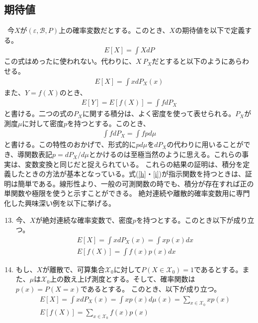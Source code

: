 \documentclass[a4j,12pt]{jarticle}
\begin{document}
\subsection{期待値}
\ 今$X$が$(\varepsilon,\mathcal{B},P)$上の確率変数だとする。このとき、$X$の期待値を以下で定義する。
\begin{align}
\label{j}
E[X] = \int X dP
\end{align}
この式はめったに使われない。代わりに、$X ~ P_{X}$だとすると以下のようにあらわせる。
\begin{align}
\label{g}
E[X] = \int x dP_{X}(x)
\end{align}
また、$Y = f(X)$のとき、
\begin{align}
\label{h}
E[Y] = E[f(X)] = \int f dP_{X}
\end{align}
と書ける。二つの式の$P_{X}$に関する積分は、よく密度を使って表せられる。$P_{X}$が測度$\mu$に対して密度$p$を持つとする。このとき、
\begin{align}
\label{i}
\int f dP_{X} = \int fpd\mu
\end{align}
と書ける。この特性のおかげで、形式的に$pd\mu$を$dP_{X}$の代わりに用いることができ、導関数表記$p = dP_{X}/d\mu$とかけるのは至極当然のように思える。これらの事実は、変数変換と同じだと捉えられている。
これらの結果の証明は、積分を定義したときの方法が基本となっている。式(\ref{h}・\ref{i})が指示関数を持つときは、証明は簡単である。線形性より、一般の可測関数の時でも、積分が存在すれば正の単関数や極限を使うと示すことができる。
絶対連続や離散的確率変数用に専門化した興味深い例を以下に挙げる。
\begin{enumerate}[label = 例1. \arabic*]
\setcounter{enumi}{12}
\item 今、$X$が絶対連続な確率変数で、密度$p$を持つとする。このとき以下が成り立つ。
\begin{align}
E[X] = \int x dP_{X}(x) = \int x p(x)dx \nonumber \\
E[f(X)] = \int f(x)p(x)dx
\end{align}
\item もし、$X$が離散で、可算集合$\mathcal{X}_{0}$に対して$P(X \in \mathcal{X}_{0}) = 1$であるとする。また、$\mu$は$\mathcal{X}_{0}$上の数え上げ測度とする。そして、確率関数は$p(x) = P(X = x)$であるとする。
このとき、以下が成り立つ。
\begin{align}
\label{q}
E[X] = \int x dP_{X}(x) = \int xp(x)d\mu(x)=\sum_{x\in\mathcal{X}_{0}}xp(x) \nonumber \\
E[f(X)] = \sum_{x\in\mathcal{X}_{0}}f(x)p(x)
\end{align}
\end{enumerate}
\end{document}
